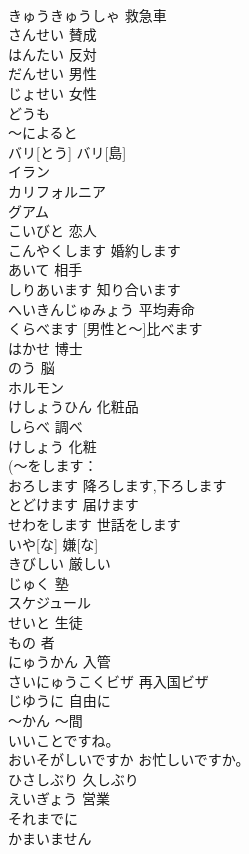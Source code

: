 \documentclass[8pt]{extreport}
\begin{document}
\begin{CJK}{UTF8}{min}
\\	きゅうきゅうしゃ	救急車	
\\	さんせい	賛成	
\\	はんたい	反対	
\\	だんせい	男性	
\\	じょせい	女性	
\\	どうも			
\\	～によると			
\\	バリ[とう]	バリ[島]	
\\	イラン			
\\	カリフォルニア			
\\	グアム			
\\	こいびと	恋人	
\\	こんやくします	婚約します	
\\	あいて	相手	
\\	しりあいます	知り合います	
\\	へいきんじゅみょう	平均寿命	
\\	[だんせいと～]くらべます	[男性と～]比べます	
\\	はかせ	博士	
\\	のう	脳	
\\	ホルモン			
\\	けしょうひん	化粧品	
\\	しらべ	調べ	
\\	けしょう	化粧	
\\	(～をします：
\\	おろします	降ろします,下ろします	
\\	とどけます	届けます	
\\	せわをします	世話をします	
\\	いや[な]	嫌[な]	
\\	きびしい	厳しい	
\\	じゅく	塾	
\\	スケジュール			
\\	せいと	生徒	
\\	もの	者	
\\	にゅうかん	入管	
\\	さいにゅうこくビザ	再入国ビザ	
\\	じゆうに	自由に	
\\	～かん	～間	
\\	いいことですね。			
\\	おいそがしいですか	お忙しいですか。	
\\	ひさしぶり	久しぶり	
\\	えいぎょう	営業	
\\	それまでに			
\\	かまいません			

\end{CJK}
\end{document}
